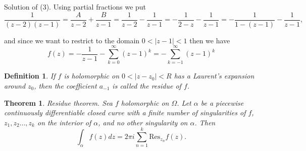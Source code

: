 \documentclass{amsart}
\newtheorem{thm}{Theorem}
\newtheorem{mydef}{Definition}
\begin{document}
Solution of  (3). Using partial fractions we put
\[ \frac{1}{(z-2)(z-1)} = \frac{A}{z-2} + \frac{B}{z-1} =  \frac{1}{z-2} - \frac{1}{z-1} = -  \frac{1}{2 - z} - \frac{1}{z-1} = -  \frac{1}{1 - (z - 1)} - \frac{1}{z-1} ,\]

and since we want to restrict to the domain \(0 < |z - 1| < 1\) then we have
\[ f(z) = - \frac{1}{z-1} - \sum_{k=0}^{\infty} (z-1)^k = - \sum_{k=-1}^{\infty} (z-1)^k \]

\begin{mydef}
If \(f\) is holomorphic on \(0<|z - z_0| < R\) has a Laurent's expansion around \(z_0\), then the coefficient \(a_{-1}\) is called \alert{the residue} of \(f\).
\end{mydef}


\begin{thm}
\alert{Residue theorem}. Sea \(f\) holomorphic on \(\Omega\). Let \(\alpha\) be a piecewise continuously differentiable closed curve with a finite number of singularities of \(f\), \(z_1, z_2 \ldots, z_k\)
on the interior of \(\alpha\), and no other singularity on \(\alpha\). Then
\[ \int_{\alpha}f(z) dz = 2\pi i \sum_{n=1}^k \mbox{Res}_{z_n}f(z). \]
\end{thm}
\end{document}

